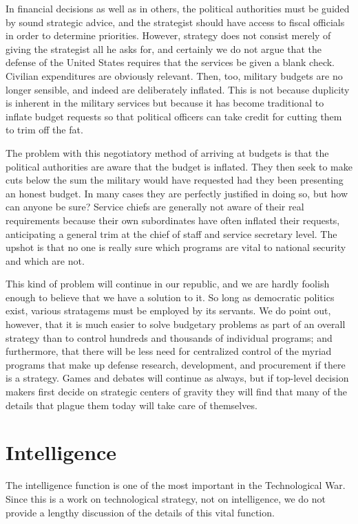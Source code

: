 In financial decisions as well as in others, the political authorities must be guided by sound strategic advice, and the strategist should have access to fiscal officials in order to determine priorities. However, strategy does not consist merely of giving the strategist all he asks for, and certainly we do not argue that the defense of the United States requires that the services be given a blank check. Civilian expenditures are obviously relevant. Then, too, military budgets are no longer sensible, and indeed are deliberately inflated. This is not because duplicity is inherent in the military services but because it has become traditional to inflate budget requests so that political officers can take credit for cutting them to trim off the fat.

The problem with this negotiatory method of arriving at budgets is that the political authorities are aware that the budget is inflated. They then seek to make cuts below the sum the military would have requested had they been presenting an honest budget. In many cases they are perfectly justified in doing so, but how can anyone be sure? Service chiefs are generally not aware of their real requirements because their own subordinates have often inflated their requests, anticipating a general trim at the chief of staff and service secretary level. The upshot is that no one is really sure which programs are vital to national security and which are not.

This kind of problem will continue in our republic, and we are hardly foolish enough to believe that we have a solution to it. So long as democratic politics exist, various stratagems must be employed by its servants. We do point out, however, that it is much easier to solve budgetary problems as part of an overall strategy than to control hundreds and thousands of individual programs; and furthermore, that there will be less need for centralized control of the myriad programs that make up defense research, development, and procurement if there is a strategy. Games and debates will continue as always, but if top-level decision makers first decide on strategic centers of gravity they will find that many of the details that plague them today will take care of themselves.

\section{Intelligence}
The intelligence function is one of the most important in the Technological War. Since this is a work on technological strategy, not on intelligence, we do not provide a lengthy discussion of the details of this vital function.

